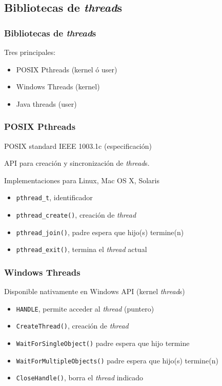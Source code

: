 \documentclass[letter]{beamer}
\begin{document}
\subsection{Bibliotecas de {\em thread}s}

\begin{frame}
  \frametitle{ Bibliotecas de {\em thread}s }

  Tres principales:
  
  \begin{itemize}
    \item POSIX Pthreads (kernel ó user)
    \item Windows Threads (kernel)
    \item Java threads (user)
  \end{itemize}


\end{frame}

\begin{frame}
  \frametitle{POSIX Pthreads}

  POSIX standard IEEE 1003.1c (especificación)
  
  API para creación y sincronización de {\em thread}s.
  
  Implementaciones para Linux, Mac OS X, Solaris
  
  \begin{itemize}
    \item {\tt pthread\_t}, identificador
    \item {\tt pthread\_create()}, creación de {\em thread}
    \item {\tt pthread\_join()}, padre espera que hijo(s) termine(n)
    \item {\tt pthread\_exit()}, termina el {\em thread} actual
  \end{itemize}
  
\end{frame}

\begin{frame}
  \frametitle{Windows Threads}

  Disponible nativamente en Windows API (kernel {\em thread}s)
    
  \begin{itemize}
    \item {\tt HANDLE}, permite acceder al {\em thread} (puntero)
    \item {\tt CreateThread()}, creación de {\em thread}
    \item {\tt WaitForSingleObject()} padre espera que hijo termine
    \item {\tt WaitForMultipleObjects()} padre espera que hijo(s) termine(n)
    \item {\tt CloseHandle()}, borra el {\em thread} indicado
  \end{itemize}
  
\end{frame}
\end{document}
